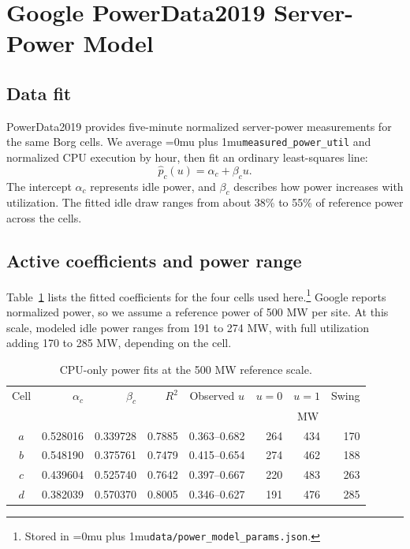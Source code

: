 \documentclass[conference]{IEEEtran}
\newcommand{\codepath}[1]{{\Urlmuskip=0mu plus 1mu\relax\nolinkurl{#1}}}
\begin{document}
\section{Google PowerData2019 Server-Power Model}
\label{sec:powerdata2019}

\subsection{Data fit}
\label{subsec:powerdata-purpose}

PowerData2019 \cite{googlePowerData2019} provides five-minute normalized
server-power measurements for the same Borg cells. We average
\codepath{measured_power_util} and normalized CPU execution by hour, then
fit an ordinary least-squares line:
\begin{equation}
  \widehat p_c(u)
  =
  \alpha_c+\beta_c u.
  \label{eq:powerdata-affine-fit}
\end{equation}
The intercept \(\alpha_c\) represents idle power, and \(\beta_c\) describes
how power increases with utilization. The fitted idle draw ranges from
about 38\% to 55\% of reference power across the cells.

\subsection{Active coefficients and power range}
\label{subsec:powerdata-coefficients}

Table~\ref{tab:powerdata-coefficients} lists the fitted coefficients for the
four cells used here.\footnote{Stored in
\codepath{data/power_model_params.json}.} Google reports normalized power,
so we assume a reference power of 500 MW per site. At this scale, modeled
idle power ranges from 191 to 274 MW, with full utilization adding
170 to 285 MW, depending on the cell.

\begin{table}[htbp]
  \centering
  \small
  \caption{CPU-only power fits at the 500 MW reference scale.}
  \label{tab:powerdata-coefficients}
  \begin{tabular}{@{}crrrcrrr@{}}
    \toprule
    Cell & \(\alpha_c\) & \(\beta_c\) & \(R^2\) & Observed \(u\)
         & \(u=0\) & \(u=1\) & Swing \\
         & & & & & \multicolumn{3}{c}{MW} \\
    \midrule
    \(a\) & 0.528016 & 0.339728 & 0.7885 & 0.363--0.682
          & 264 & 434 & 170 \\
    \(b\) & 0.548190 & 0.375761 & 0.7479 & 0.415--0.654
          & 274 & 462 & 188 \\
    \(c\) & 0.439604 & 0.525740 & 0.7642 & 0.397--0.667
          & 220 & 483 & 263 \\
    \(d\) & 0.382039 & 0.570370 & 0.8005 & 0.346--0.627
          & 191 & 476 & 285 \\
    \bottomrule
  \end{tabular}
\end{table}
\end{document}
